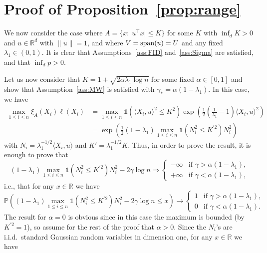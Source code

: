 \documentclass[]{article}
\newcommand{\Indicator}[1]{\mathds{1}\left(#1\right)}
\renewcommand{\P}{\mathbb{P}}
\newcommand{\R}{\mathbb{R}}
\theoremstyle{plain}
\theoremstyle{definition}
\begin{document}
\section{Proof of Proposition~\ref{prop:range}}


We now consider the case where $A = \{x: \lvert u^\top x \rvert \leq K\}$ for some $K$ with $\inf_d K > 0$ and $u \in \R^d$ with $\lVert u \rVert = 1$, and where $V = {\rm span}(u) = U$ and any fixed $\lambda_1 \in (0,1)$. It is clear that Assumptions~\ref{ass:FID} and~\ref{ass:Sigma} are satisfied, and that $\inf_d p > 0$.

Let us now consider that $K = 1 + \sqrt{2 \alpha \lambda_1 \log n}$ for some fixed $\alpha \in [0,1]$ and show that Assumption~\ref{ass:MW} is satisfied with $\gamma_* = \alpha (1-\lambda_1)$. In this case, we have
\begin{align*}
	\max_{1 \leq i \leq n} \xi_A(X_i) \ell(X_i) & = \max_{1 \leq i \leq n} \Indicator{\langle X_i, u \rangle^2 \leq K^2} \exp \left( \frac{1}{2} \left( \frac{1}{\lambda_1} - 1 \right) \langle X_i, u \rangle^2 \right)\\
	& = \exp \left( \frac{1}{2} \left( 1 - \lambda_1 \right) \max_{1 \leq i \leq n} \Indicator{N_i^2 \leq K^{\prime 2}} N_i^2 \right)
\end{align*}
with $N_i = \lambda_1^{-1/2} \langle X_i, u \rangle$ and $K' = \lambda_1^{-1/2} K$. Thus, in order to prove the result, it is enough to prove that
\[ \left( 1 - \lambda_1 \right) \max_{1 \leq i \leq n} \Indicator{N_i^2 \leq K^{\prime 2}} N_i^2 - 2 \gamma \log n \Rightarrow \left\{ \begin{array}{ll}
		-\infty & \text{if } \gamma > \alpha (1-\lambda_1),\\
		+\infty & \text{if } \gamma < \alpha (1-\lambda_1),
	\end{array} \right. \]
i.e., that for any $x \in \R$ we have
\begin{equation} \label{eq:goal-A}
	\P \left( (1-\lambda_1) \max_{1 \leq i \leq n} \Indicator{N_i^2 \leq K^{\prime 2}} N_i^2 - 2 \gamma \log n \leq x \right) \to \left\{ \begin{array}{ll}
		1 & \text{if } \gamma > \alpha (1-\lambda_1),\\
		0 & \text{if } \gamma < \alpha (1-\lambda_1).
	\end{array} \right.
\end{equation}
The result for $\alpha = 0$ is obvious since in this case the maximum is bounded (by $K^{\prime 2} = 1$), so assume for the rest of the proof that $\alpha > 0$. Since the $N_i$'s are i.i.d.\ standard Gaussian random variables in dimension one, for any $x \in \R$ we have
\end{document}
